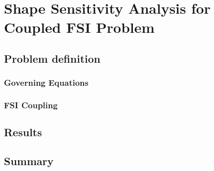 \chapter{Shape Sensitivity Analysis for Coupled FSI Problem}

\section{Problem definition}
\subsection{Governing Equations}
\subsection{FSI Coupling}
\section{Results}
\section{Summary}
